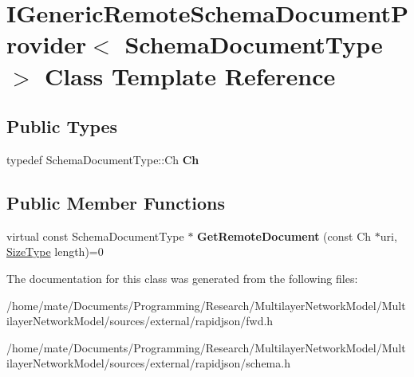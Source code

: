 \hypertarget{classIGenericRemoteSchemaDocumentProvider}{}\section{I\+Generic\+Remote\+Schema\+Document\+Provider$<$ Schema\+Document\+Type $>$ Class Template Reference}
\label{classIGenericRemoteSchemaDocumentProvider}
\subsection*{Public Types}
\begin{DoxyCompactItemize}
\item 
typedef Schema\+Document\+Type\+::\+Ch {\bfseries Ch}\hypertarget{classIGenericRemoteSchemaDocumentProvider_acfcd5492c3df8ff56cd2d84d36cc0ceb}{}\label{classIGenericRemoteSchemaDocumentProvider_acfcd5492c3df8ff56cd2d84d36cc0ceb}

\end{DoxyCompactItemize}
\subsection*{Public Member Functions}
\begin{DoxyCompactItemize}
\item 
virtual const Schema\+Document\+Type $\ast$ {\bfseries Get\+Remote\+Document} (const Ch $\ast$uri, \hyperlink{rapidjson_8h_a5ed6e6e67250fadbd041127e6386dcb5}{Size\+Type} length)=0\hypertarget{classIGenericRemoteSchemaDocumentProvider_aad112a069dd57fe850fafd04cbb4777b}{}\label{classIGenericRemoteSchemaDocumentProvider_aad112a069dd57fe850fafd04cbb4777b}

\end{DoxyCompactItemize}


The documentation for this class was generated from the following files\+:\begin{DoxyCompactItemize}
\item 
/home/mate/\+Documents/\+Programming/\+Research/\+Multilayer\+Network\+Model/\+Multilayer\+Network\+Model/sources/external/rapidjson/fwd.\+h\item 
/home/mate/\+Documents/\+Programming/\+Research/\+Multilayer\+Network\+Model/\+Multilayer\+Network\+Model/sources/external/rapidjson/schema.\+h\end{DoxyCompactItemize}
